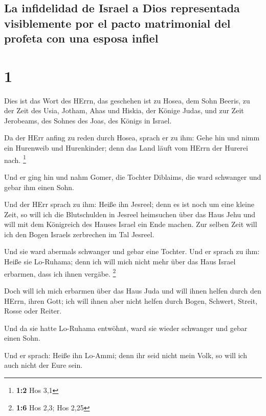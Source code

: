 \hypertarget{la-infidelidad-de-israel-a-dios-representada-visiblemente-por-el-pacto-matrimonial-del-profeta-con-una-esposa-infiel}{%
\subsection{La infidelidad de Israel a Dios representada visiblemente
por el pacto matrimonial del profeta con una esposa
infiel}\label{la-infidelidad-de-israel-a-dios-representada-visiblemente-por-el-pacto-matrimonial-del-profeta-con-una-esposa-infiel}}

\hypertarget{section}{%
\section{1}\label{section}}

 Dies ist das Wort des HErrn, das geschehen ist zu Hosea,
dem Sohn Beeris, zu der Zeit des Usia, Jotham, Ahas und Hiskia, der
Könige Judas, und zur Zeit Jerobeams, des Sohnes des Joas, des Königs in
Israel.

 Da der HErr anfing zu reden durch Hosea, sprach er zu
ihm: Gehe hin und nimm ein Hurenweib und Hurenkinder; denn das Land
läuft vom HErrn der Hurerei nach. \footnote{\textbf{1:2} Hos 3,1}

 Und er ging hin und nahm Gomer, die Tochter Diblaims, die
ward schwanger und gebar ihm einen Sohn.

 Und der HErr sprach zu ihm: Heiße ihn Jesreel; denn es
ist noch um eine kleine Zeit, so will ich die Blutschulden in Jesreel
heimsuchen über das Haus Jehu und will mit dem Königreich des Hauses
Israel ein Ende machen.  Zur selben Zeit will ich den
Bogen Israels zerbrechen im Tal Jesreel.

 Und sie ward abermals schwanger und gebar eine Tochter.
Und er sprach zu ihm: Heiße sie Lo-Ruhama; denn ich will mich nicht mehr
über das Haus Israel erbarmen, dass ich ihnen vergäbe. \footnote{\textbf{1:6}
  Hos 2,3; Hos 2,25}

 Doch will ich mich erbarmen über das Haus Juda und will
ihnen helfen durch den HErrn, ihren Gott; ich will ihnen aber nicht
helfen durch Bogen, Schwert, Streit, Rosse oder Reiter.

 Und da sie hatte Lo-Ruhama entwöhnt, ward sie wieder
schwanger und gebar einen Sohn.

 Und er sprach: Heiße ihn Lo-Ammi; denn ihr seid nicht
mein Volk, so will ich auch nicht der Eure sein.

